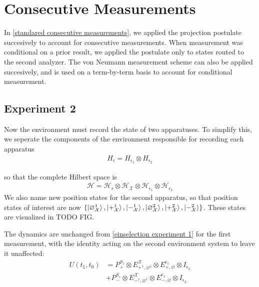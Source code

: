 \section{Consecutive Measurements}

In \autoref{standared consecutive measurements}, we applied the projection postulate succesively to account for consecutive measurements. When measurement was conditional on a prior result, we applied the postulate only to states routed to the second analyzer. The von Neumann measurement scheme can also be applied succesively, and is used on a term-by-term basis to account for conditional measurement.

\subsection{Experiment 2}
Now the environment must record the state of two apparatuses. To simplify this, we seperate the components of the environment responsible for recording each apparatus
\begin{align}
  H_\epsilon = H_{\epsilon_1} \otimes H_{\epsilon_2}
\end{align}

so that the complete Hilbert space is
\begin{align}
  \mathcal{H} = \mathcal{H}_s \otimes \mathcal{H}_\mathcal{X} \otimes \mathcal{H}_{\epsilon_1} \otimes \mathcal{H}_{\epsilon_2}
\end{align}
We also name new position states for the second apparatus, so that position states of interest are now $\{ \ket{\varnothing_{\mathcal{X}}^1}, \ket{+_{\mathcal{X}}^1}, \ket{-_{\mathcal{X}}^1}, \ket{\varnothing_{\mathcal{X}}^2}, \ket{+_{\mathcal{X}}^2}, \ket{-_{\mathcal{X}}^2} \}$. These states are visualized in TODO FIG.

The dynamics are unchanged from \autoref{einselection experiment 1} for the first measurement, with the identity acting on the second environment system to leave it unaffected:
\begin{align}
  U(t_1, t_0) &= P^{S_z}_+ \otimes E^{\mathcal{X}}_{+^1, \varnothing^1}  \nonumber \otimes E^{\epsilon_1}_{+, \varnothing} \otimes I_{\epsilon_2}\\ \nonumber
  &+ P^{S_z}_- \otimes E^{\mathcal{X}}_{-^1, \varnothing^1} \otimes E^{\epsilon_1}_{-,\varnothing} \otimes I_{\epsilon_2}
\end{align}

